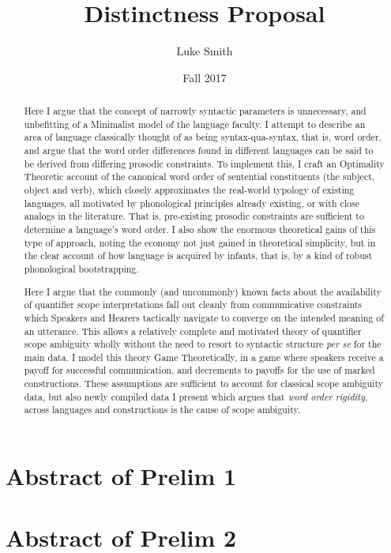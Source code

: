 \documentclass{article}
\title{Distinctness Proposal}
\author{Luke Smith}
\date{Fall 2017}
\begin{document}
\maketitle
	
\section{Abstract of Prelim 1}

\begin{abstract}
Here I argue that the concept of narrowly syntactic parameters is unnecessary, and unbefitting of a Minimalist model of the language faculty.
I attempt to describe an area of language classically thought of as being syntax-qua-syntax, that is, word order, and argue that the word order differences found in different languages can be said to be derived from differing prosodic constraints.
To implement this, I craft an Optimality Theoretic account of the canonical word order of sentential constituents (the subject, object and verb), which closely approximates the real-world typology of existing languages, all motivated by phonological principles already existing, or with close analogs in the literature.
That is, pre-existing prosodic constraints are sufficient to determine a language's word order.
I also show the enormous theoretical gains of this type of approach, noting the economy not just gained in theoretical simplicity, but in the clear account of how language is acquired by infants, that is, by a kind of robust phonological bootstrapping.
\end{abstract}

\section{Abstract of Prelim 2}

\begin{abstract}
	Here I argue that the commonly (and uncommonly) known facts about the availability of quantifier scope interpretations fall out cleanly from communicative constraints which Speakers and Hearers tactically navigate to converge on the intended meaning of an utterance.
	This allows a relatively complete and motivated theory of quantifier scope ambiguity wholly without the need to resort to syntactic structure \textit{per se} for the main data.
	I model this theory Game Theoretically, in a game where speakers receive a payoff for successful communication, and decrements to payoffs for the use of marked constructions.
	These assumptions are sufficient to account for classical scope ambiguity data, but also newly compiled data I present which argues that \emph{word order rigidity}, across languages and constructions is the cause of scope ambiguity.
\end{abstract}
\end{document}

